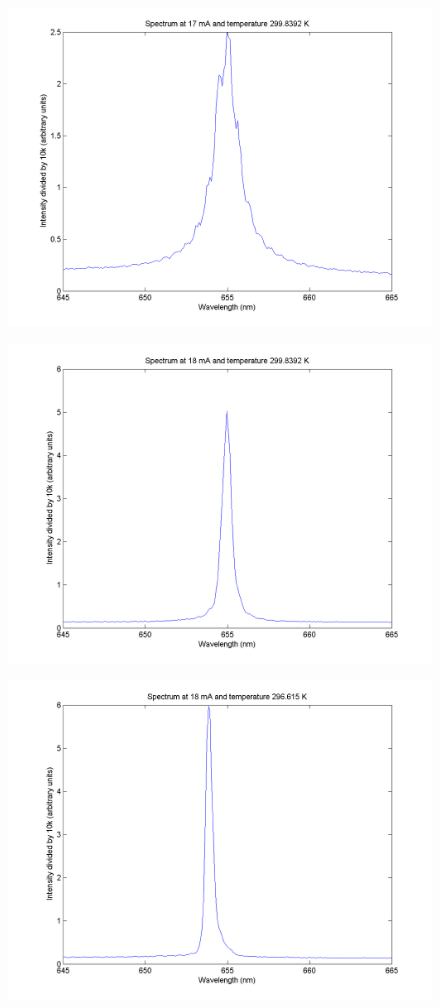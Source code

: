 \documentclass[10pt,a4paper]{article}
\begin{document}
\begin{figure}[H]
\centering
\includegraphics[scale = 0.5]{../Analysis/17mAT9p214.png} 
\end{figure}
\begin{figure}[H]
\centering
\includegraphics[scale = 0.5]{../Analysis/18mAT9p214.png}
\end{figure} 
\begin{figure}[H]
\centering
\includegraphics[scale = 0.5]{../Analysis/18mAT10p643.png}
\end{figure}
\end{document}
